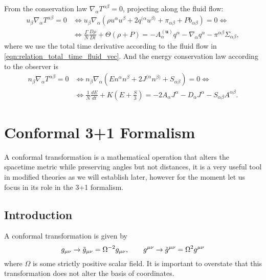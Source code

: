 From the conservation law $\nabla_\alpha T^{\alpha\beta}=0$, projecting along the fluid flow:
\begin{align}
    u_\beta\nabla_\alpha T^{\alpha\beta}=0&\Leftrightarrow u_\beta\nabla_\alpha\left(\rho u^\alpha u^\beta + 2q^{(\alpha} u^{\beta)} +\pi_{\alpha\beta} + P b_{\alpha\beta}\right)=0\Leftrightarrow \nonumber\\
    &\Leftrightarrow \frac{\Gamma}{N}\frac{D\rho}{Dt} + \Theta(\rho+P)=  - A^{(\mathbf{u})}_\alpha q^\alpha - \nabla_\alpha q^\alpha -\pi^{\alpha\beta}\Sigma_{\alpha\beta}
    \label{eqn:energy_conserv_law_fluid},
\end{align}
where we use the total time derivative according to the fluid flow in \cref{eqn:relation_total_time_fluid_vec}.
And the energy conservation law according to the observer is
\begin{align}
    n_\beta\nabla_\alpha T^{\alpha\beta}=0&\Leftrightarrow n_\beta\nabla_\alpha\left(E n^\alpha n^\beta + 2J^{(\alpha} n^{\beta)} +S_{\alpha\beta}\right)=0\Leftrightarrow \nonumber\\
    &\Leftrightarrow\frac{1}{N}\frac{dE}{dt} + K\left(E+\frac{S}{3}\right)=  - 2A_\alpha J^\alpha - D_\alpha J^\alpha -S_{\alpha\beta}A^{\alpha\beta}.
    \label{eqn:energy_conserv_law_normal}
\end{align}

\section{Conformal 3+1 Formalism}

A conformal transformation is a mathematical operation that alters the spacetime metric while preserving angles but not distances, it is a very useful tool in modified theories as we will establish later, however for the moment let us focus in its role in the 3+1 formalism.

\subsection{Introduction}

A conformal transformation is given by
\begin{equation}
    g_{\mu\nu}\rightarrow \Tilde{g}_{\mu\nu}=\Omega^{-2}g_{\mu\nu}, \qquad g^{\mu\nu}\rightarrow \Tilde{g}^{\mu\nu}=\Omega^{2}g^{\mu\nu}
    \label{eqn:def_conf_transf}
\end{equation}
where $\Omega$ is some strictly positive scalar field. It is important to overstate that this transformation does not alter the basis of coordinates. 

